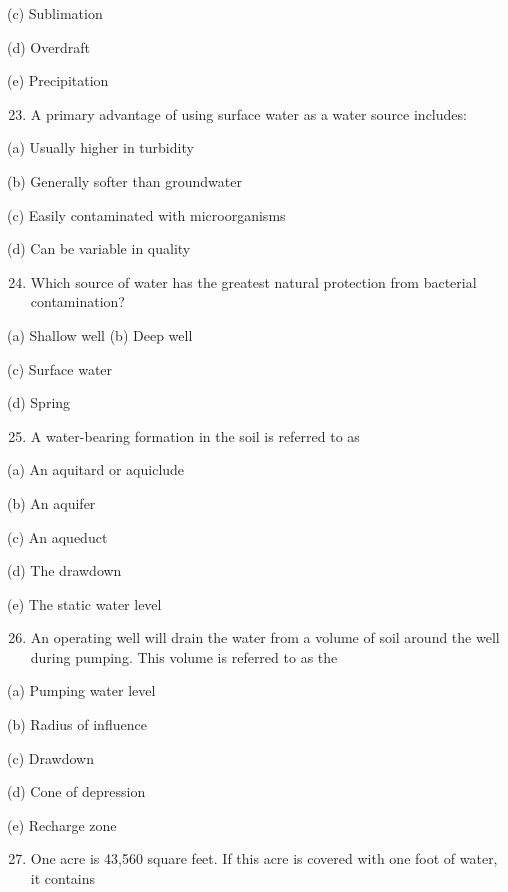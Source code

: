 \documentclass[10pt]{article}
\begin{document}
(c) Sublimation

(d) Overdraft

(e) Precipitation

\begin{enumerate}
  \setcounter{enumi}{22}
  \item A primary advantage of using surface water as a water source includes:
\end{enumerate}

(a) Usually higher in turbidity

(b) Generally softer than groundwater

(c) Easily contaminated with microorganisms

(d) Can be variable in quality

\begin{enumerate}
  \setcounter{enumi}{23}
  \item Which source of water has the greatest natural protection from bacterial contamination?
\end{enumerate}

(a) Shallow well (b) Deep well

(c) Surface water

(d) Spring

\begin{enumerate}
  \setcounter{enumi}{24}
  \item A water-bearing formation in the soil is referred to as
\end{enumerate}

(a) An aquitard or aquiclude

(b) An aquifer

(c) An aqueduct

(d) The drawdown

(e) The static water level

\begin{enumerate}
  \setcounter{enumi}{25}
  \item An operating well will drain the water from a volume of soil around the well during pumping. This volume is referred to as the
\end{enumerate}

(a) Pumping water level

(b) Radius of influence

(c) Drawdown

(d) Cone of depression

(e) Recharge zone

\begin{enumerate}
  \setcounter{enumi}{26}
  \item One acre is 43,560 square feet. If this acre is covered with one foot of water, it contains
\end{enumerate}
\end{document}
